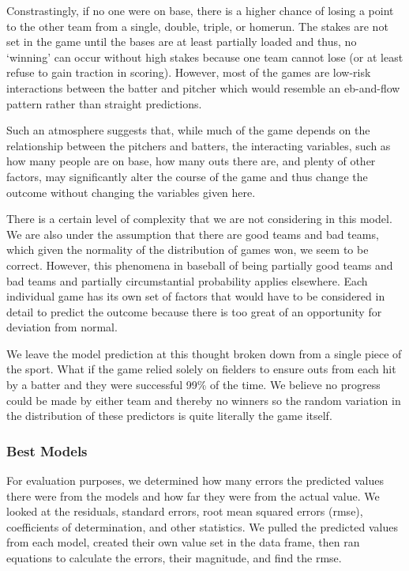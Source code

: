 \documentclass[
]{article}
\begin{document}
Constrastingly, if no one were on base, there is a higher chance of
losing a point to the other team from a single, double, triple, or
homerun. The stakes are not set in the game until the bases are at least
partially loaded and thus, no `winning' can occur without high stakes
because one team cannot lose (or at least refuse to gain traction in
scoring). However, most of the games are low-risk interactions between
the batter and pitcher which would resemble an eb-and-flow pattern
rather than straight predictions.

Such an atmosphere suggests that, while much of the game depends on the
relationship between the pitchers and batters, the interacting
variables, such as how many people are on base, how many outs there are,
and plenty of other factors, may significantly alter the course of the
game and thus change the outcome without changing the variables given
here.

There is a certain level of complexity that we are not considering in
this model. We are also under the assumption that there are good teams
and bad teams, which given the normality of the distribution of games
won, we seem to be correct. However, this phenomena in baseball of being
partially good teams and bad teams and partially circumstantial
probability applies elsewhere. Each individual game has its own set of
factors that would have to be considered in detail to predict the
outcome because there is too great of an opportunity for deviation from
normal.

We leave the model prediction at this thought broken down from a single
piece of the sport. What if the game relied solely on fielders to ensure
outs from each hit by a batter and they were successful 99\% of the
time. We believe no progress could be made by either team and thereby no
winners so the random variation in the distribution of these predictors
is quite literally the game itself.

\hypertarget{best-models}{%
\subsubsection{Best Models}\label{best-models}}

For evaluation purposes, we determined how many errors the predicted
values there were from the models and how far they were from the actual
value. We looked at the residuals, standard errors, root mean squared
errors (rmse), coefficients of determination, and other statistics. We
pulled the predicted values from each model, created their own value set
in the data frame, then ran equations to calculate the errors, their
magnitude, and find the rmse.
\end{document}
